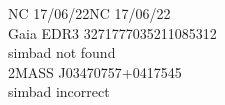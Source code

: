 NC 17/06/22NC 17/06/22\\

Gaia EDR3 3271777035211085312\\
simbad not found \\

2MASS J03470757+0417545\\
simbad incorrect\\
